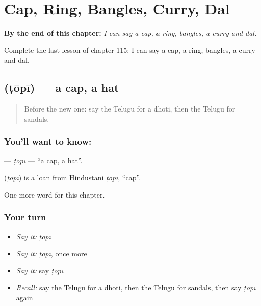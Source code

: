 
\chapter{Cap, Ring, Bangles, Curry, Dal}
\label{ch:te-cap-ring-bangles-curry-dal}

\begin{chapteropening}
\textbf{By the end of this chapter:} \emph{I can say a cap, a ring, bangles, a curry and dal.}

Complete the last lesson of chapter 115: I can say a cap, a ring, bangles, a curry and dal.
\end{chapteropening}

\section[\texorpdfstring{\te{టోపీ} (ṭōpī)}{టోపీ (ṭōpī)}]{ (ṭōpī) — a cap, a hat}

\label{lesson:TE-C115-topi}



\begin{quote}
Before the new one: say the Telugu for a dhoti, then the Telugu for sandals.
\end{quote}

\subsection*{You'll want to know: }
\textbf{} — \emph{ṭōpī} — \textquotedblleft{}a cap, a hat\textquotedblright{}.

\begin{cousinweb}
\textbf{} (\emph{ṭōpī}) is a loan from Hindustani \emph{ṭōpī}, \textquotedblleft{}cap\textquotedblright{}.
\end{cousinweb}

\begin{grammarlens}[title={What you've built}]
One more word for this chapter.
\end{grammarlens}

\subsection*{Your turn}
\begin{itemize}
\raggedright
  \item \emph{Say it:} \emph{ṭōpī}
  \item \emph{Say it:} \emph{ṭōpī}, once more
  \item \emph{Say it:} say \emph{ṭōpī}
  \item \emph{Recall:} say the Telugu for a dhoti, then the Telugu for sandals, then say \emph{ṭōpī} again
\end{itemize}

